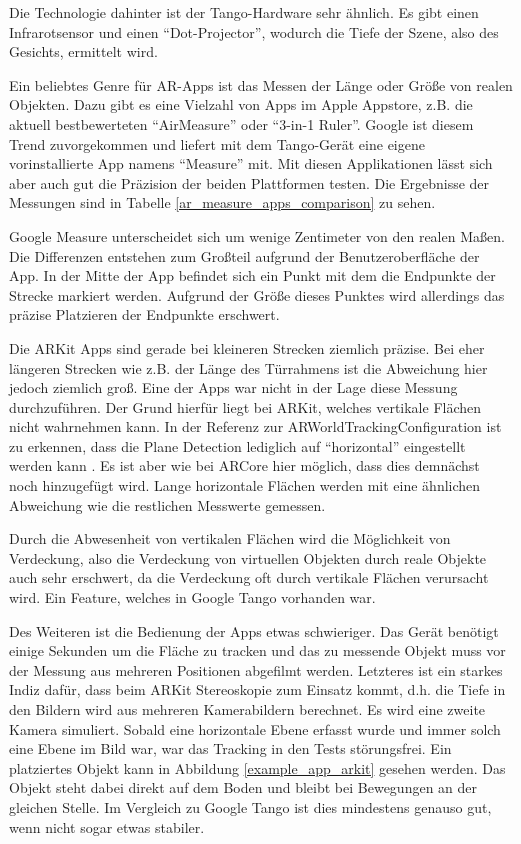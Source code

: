 Die Technologie dahinter ist der Tango-Hardware sehr ähnlich. Es gibt einen Infrarotsensor und einen "`Dot-Projector"', wodurch die Tiefe der Szene, also des Gesichts, ermittelt wird. \cite{iphoneX_display}

Ein beliebtes Genre für AR-Apps ist das Messen der Länge oder Größe von realen Objekten. Dazu gibt es eine Vielzahl von Apps im Apple Appstore, z.B. die aktuell bestbewerteten "`AirMeasure"' oder "`3-in-1 Ruler"'. Google ist diesem Trend zuvorgekommen und liefert mit dem Tango-Gerät eine eigene vorinstallierte App namens "`Measure"' mit. Mit diesen Applikationen lässt sich aber auch gut die Präzision der beiden Plattformen testen. Die Ergebnisse der Messungen sind in Tabelle \ref{ar_measure_apps_comparison} zu sehen.

Google Measure unterscheidet sich um wenige Zentimeter von den realen Maßen. Die Differenzen entstehen zum Großteil aufgrund der Benutzeroberfläche der App. In der Mitte der App befindet sich ein Punkt mit dem die Endpunkte der Strecke markiert werden. Aufgrund der Größe dieses Punktes wird allerdings das präzise Platzieren der Endpunkte erschwert.

Die ARKit Apps sind gerade bei kleineren Strecken ziemlich präzise. Bei eher längeren Strecken wie z.B. der Länge des Türrahmens ist die Abweichung hier jedoch ziemlich groß. Eine der Apps war nicht in der Lage diese Messung durchzuführen. Der Grund hierfür liegt bei ARKit, welches vertikale Flächen nicht wahrnehmen kann. In der Referenz zur ARWorldTrackingConfiguration ist zu erkennen, dass die Plane Detection lediglich auf "`horizontal"' eingestellt werden kann \cite{arkit_reference_config}. Es ist aber wie bei ARCore hier möglich, dass dies demnächst noch hinzugefügt wird.
Lange horizontale Flächen werden mit eine ähnlichen Abweichung wie die restlichen Messwerte gemessen.

Durch die Abwesenheit von vertikalen Flächen wird die Möglichkeit von Verdeckung, also die Verdeckung von virtuellen Objekten durch reale Objekte auch sehr erschwert, da die Verdeckung oft durch vertikale Flächen verursacht wird. Ein Feature, welches in Google Tango vorhanden war.

Des Weiteren ist die Bedienung der Apps etwas schwieriger. Das Gerät benötigt einige Sekunden um die Fläche zu tracken und das zu messende Objekt muss vor der Messung aus mehreren Positionen abgefilmt werden. Letzteres ist ein starkes Indiz dafür, dass beim ARKit Stereoskopie zum Einsatz kommt, d.h. die Tiefe in den Bildern wird aus mehreren Kamerabildern berechnet. Es wird eine zweite Kamera simuliert. Sobald eine horizontale Ebene erfasst wurde und immer solch eine Ebene im Bild war, war das Tracking in den Tests störungsfrei. Ein platziertes Objekt kann in Abbildung \ref{example_app_arkit} gesehen werden. Das Objekt steht dabei direkt auf dem Boden und bleibt bei Bewegungen an der gleichen Stelle. Im Vergleich zu Google Tango ist dies mindestens genauso gut, wenn nicht sogar etwas stabiler.

